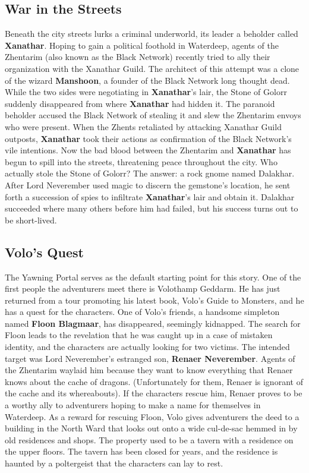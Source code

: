 \documentclass[10pt,a4paper,twoside,twocolumn,openany,nodeprecatedcode]{dndbook}
\begin{document}
\subsection{War in the Streets}
Beneath the city streets lurks a criminal underworld, its leader a beholder called \textbf{Xanathar}. Hoping to gain a political foothold in Waterdeep, agents of the Zhentarim (also known as the Black Network) recently tried to ally their organization with the Xanathar Guild. The architect of this attempt was a clone of the wizard \textbf{Manshoon}, a founder of the Black Network long thought dead.
While the two sides were negotiating in \textbf{Xanathar}'s lair, the Stone of Golorr suddenly disappeared from where \textbf{Xanathar} had hidden it. The paranoid beholder accused the Black Network of stealing it and slew the Zhentarim envoys who were present. When the Zhents retaliated by attacking Xanathar Guild outposts, \textbf{Xanathar} took their actions as confirmation of the Black Network's vile intentions. Now the bad blood between the Zhentarim and \textbf{Xanathar} has begun to spill into the streets, threatening peace throughout the city.
Who actually stole the Stone of Golorr? The answer: a rock gnome named Dalakhar. After Lord Neverember used magic to discern the gemstone's location, he sent forth a succession of spies to infiltrate \textbf{Xanathar}'s lair and obtain it. Dalakhar succeeded where many others before him had failed, but his success turns out to be short-lived.
\subsection{Volo's Quest}
The Yawning Portal serves as the default starting point for this story. One of the first people the adventurers meet there is Volothamp Geddarm. He has just returned from a tour promoting his latest book, Volo's Guide to Monsters, and he has a quest for the characters.
One of Volo's friends, a handsome simpleton named \textbf{Floon Blagmaar}, has disappeared, seemingly kidnapped. The search for Floon leads to the revelation that he was caught up in a case of mistaken identity, and the characters are actually looking for two victims. The intended target was Lord Neverember's estranged son, \textbf{Renaer Neverember}. Agents of the Zhentarim waylaid him because they want to know everything that Renaer knows about the cache of dragons. (Unfortunately for them, Renaer is ignorant of the cache and its whereabouts). If the characters rescue him, Renaer proves to be a worthy ally to adventurers hoping to make a name for themselves in Waterdeep.
As a reward for rescuing Floon, Volo gives adventurers the deed to a building in the North Ward that looks out onto a wide cul-de-sac hemmed in by old residences and shops. The property used to be a tavern with a residence on the upper floors. The tavern has been closed for years, and the residence is haunted by a poltergeist that the characters can lay to rest.
\end{document}
